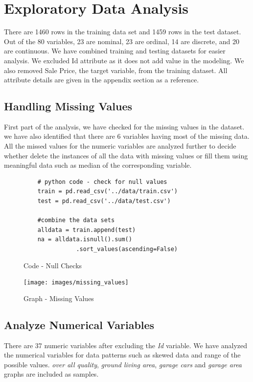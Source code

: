\documentclass[sigconf]{acmart}
\begin{document}
	\section{Exploratory Data Analysis} 
		
	There are 1460 rows in the training data set and 1459 rows in the test dataset. Out of the 80 variables, 23 are nominal, 23 are ordinal, 14 are discrete, and 20 are continuous. We have combined training and testing datasets for easier analysis. We excluded Id attribute as it does not add value in the modeling. We also removed Sale Price, the target variable, from the training dataset. All attribute details are given in the appendix section as a reference.
	\subsection{Handling Missing Values}
	
	First part of the analysis, we have checked for the missing values in the dataset. we have also identified that there are 6 variables having most of the missing data. All the missed values for the numeric variables are analyzed further to decide whether delete the instances of all the data with missing values or fill them using meaningful data such as median of the corresponding variable.
	
	\begin{figure}[htb]
	\begin{verbatim}		
	# python code - check for null values
	train = pd.read_csv('../data/train.csv')
	test = pd.read_csv('../data/test.csv')
		
	#combine the data sets
	alldata = train.append(test)	
	na = alldata.isnull().sum()
	           .sort_values(ascending=False)
	\end{verbatim}
	\caption{Code - Null Checks}\label{c:check-nulls}
	\end{figure}
	
	\begin{figure}[htb]
		\centering
		\texttt{[image: images/missing\_values]}	
		\caption{Graph - Missing Values} \label{fig:missing-values} 
	\end{figure}

	\subsection{Analyze Numerical Variables}
	There are 37 numeric variables after excluding the {\em Id} variable. We have analyzed the numerical variables for data patterns such as skewed data and range of the possible values. {\em  over all quality}, {\em ground living area}, {\em garage cars} and {\em garage area} graphs are included as samples.
	
\end{document}

